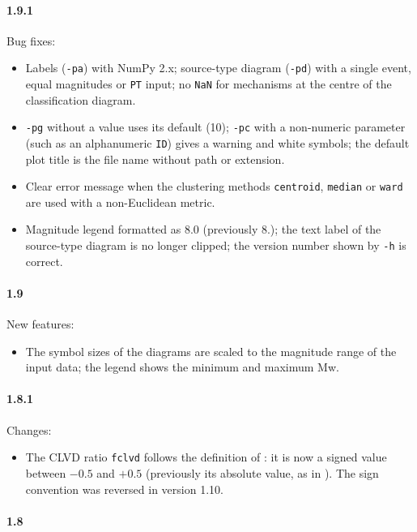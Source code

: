 \documentclass[11pt,a4paper,english]{article}
\numberwithin{equation}{section}
\begin{document}
\paragraph{1.9.1}

Bug fixes:
\begin{itemize}
\item Labels (\texttt{-pa}) with NumPy 2.x; source-type diagram (\texttt{-pd}) with a single event, equal magnitudes or \texttt{PT} input; no \texttt{NaN} for mechanisms at the centre of the classification diagram.
\item \texttt{-pg} without a value uses its default (10); \texttt{-pc} with a non-numeric parameter (such as an alphanumeric \texttt{ID}) gives a warning and white symbols; the default plot title is the file name without path or extension.
\item Clear error message when the clustering methods \texttt{centroid}, \texttt{median} or \texttt{ward} are used with a non-Euclidean metric.
\item Magnitude legend formatted as 8.0 (previously 8.); the text label of the source-type diagram is no longer clipped; the version number shown by \texttt{-h} is correct.
\end{itemize}

\paragraph{1.9}

New features:
\begin{itemize}
\item The symbol sizes of the diagrams are scaled to the magnitude range of the input data; the legend shows the minimum and maximum Mw.
\end{itemize}

\paragraph{1.8.1}

Changes:
\begin{itemize}
\item The CLVD ratio \texttt{fclvd} follows the definition of \citet{giar84}: it is now a signed value between $-0.5$ and $+0.5$ (previously its absolute value, as in \citealp{froh92}). The sign convention was reversed in version 1.10.
\end{itemize}

\paragraph{1.8}
\end{document}
